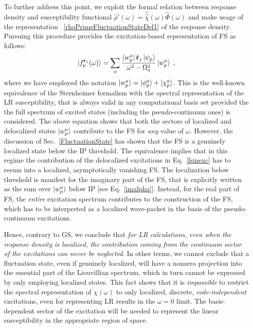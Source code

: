 \documentclass[reprint,aps,prb]{revtex4-1}
\newcommand{\be}{\begin{equation}}
\newcommand{\ee}{\end{equation}}
\newcommand{\lb}{\label}
\newcommand{\op}[1]{\hat {#1}}
\newcommand{\sop}[1]{\op{\op {#1}}}
\newcommand{\dm}{\op{\rho}}
\begin{document}
To further address this point, we exploit the formal relation between response density and susceptibility functional $\dm'(\omega) = \sop \chi(\omega)\op\Phi(\omega)$ and make usage of the representation ~\eqref{rhoPrimeFluctuationStateDef1} of the response density.
Pursuing this procedure provides the excitation-based representation of FS as follows:
\be\lb{fsinexc}
\ket{f_p^{\mathbf r_j}(\omega)}=
\sum_a \frac{\bra{w_p^a} \op{\mathbf r}_j \ket{\psi_p}}{\omega^2 - \Omega_a^2}
\ket{w_p^a}\;,
\ee
where we have employed the notation $\ket{w_p^a}=\ket{\phi_p^a}+\ket{\chi_p^a}$.
This is the well-known equivalence of the Sternheimer formalism with the spectral representation of the LR susceptibility, that is always valid
in any computational basis set provided the the full spectrum of excited states (including the pseudo-continuum ones) is considered.
The above equation shows that both the sectors of localized and delocalized states $\ket{w_p^a}$ contribute to the FS for \emph{any} value of $\omega$.
However, the discussion of Sec.~\ref{FluctuationState} has shown that the FS is a genuinely localized state below the IP threshold.
The equivalence implies that in this regime the contribution of the delocalized excitations in Eq.~\eqref{fsinexc} has to resum into a localized, asymptotically vanishing FS.
The localization below threshold is manifest for the imaginary part of the FS, that is explicitly written as the sum over $\ket{w_p^a}$ below IP [see Eq.~\eqref{imalpha}].
Instead, for the real part of FS, the \emph{entire} excitation spectrum contributes to the construction of the FS,
which has to be interpreted as a localized wave-packet in the basis of the pseudo-continuum excitations.

Hence, contrary to GS, we conclude that \emph{for LR calculations, even when the response density is localized, the contribution coming from the
continuum sector of the excitations can never be neglected}. In other terms, we cannot exclude that a fluctuation state, even if genuinely localized, will have a nonzero projection into the essential part of the Liouvillian spectrum, which in turn cannot be expressed by only employing localized states.
This fact shows that it is \emph{impossible} to restrict the spectral representation of $\chi(\omega)$ to only localized, discrete, \emph{code-independent} excitations, even for representing LR results in the $\omega=0$ limit. The basis-dependent sector of the excitation will be needed to
represent the linear susceptibility in the appropriate region of space.
\end{document}
